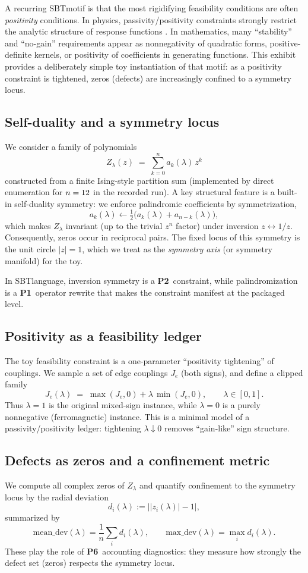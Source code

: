\documentclass[apajournal,article,submit,moreauthors,pdftex]{Definitions/mdpi}
\newcommand{\SBT}{\textsc{SBT}}
\newcommand{\Pone}{\textbf{P1}}
\newcommand{\Ptwo}{\textbf{P2}}
\newcommand{\Psix}{\textbf{P6}}
\begin{document}
A recurring \SBT motif is that the most rigidifying feasibility conditions are often \emph{positivity} conditions.
In physics, passivity/positivity constraints strongly restrict the analytic structure of response functions \cite{Willems1972II}.
In mathematics, many ``stability'' and ``no-gain'' requirements appear as nonnegativity of quadratic forms, positive-definite kernels, or positivity of coefficients in generating functions.
This exhibit provides a deliberately simple toy instantiation of that motif:
as a positivity constraint is tightened, zeros (defects) are increasingly confined to a symmetry locus.

\subsection{Self-duality and a symmetry locus}
We consider a family of polynomials
\[
Z_\lambda(z) \;=\; \sum_{k=0}^{n} a_k(\lambda)\,z^k
\]
constructed from a finite Ising-style partition sum (implemented by direct enumeration for $n=12$ in the recorded run).
A key structural feature is a built-in self-duality symmetry:
we enforce palindromic coefficients by symmetrization,
\[
a_k(\lambda)\leftarrow \tfrac12\bigl(a_k(\lambda)+a_{n-k}(\lambda)\bigr),
\]
which makes $Z_\lambda$ invariant (up to the trivial $z^n$ factor) under inversion $z\leftrightarrow 1/z$.
Consequently, zeros occur in reciprocal pairs.
The fixed locus of this symmetry is the unit circle $|z|=1$, which we treat as the \emph{symmetry axis} (or symmetry manifold) for the toy.

In \SBT language, inversion symmetry is a \Ptwo\ constraint, while palindromization is a \Pone\ operator rewrite that makes the constraint manifest at the packaged level.

\subsection{Positivity as a feasibility ledger}
The toy feasibility constraint is a one-parameter ``positivity tightening'' of couplings.
We sample a set of edge couplings $J_e$ (both signs), and define a clipped family
\[
J_e(\lambda) \;=\; \max(J_e,0) + \lambda\,\min(J_e,0),
\qquad \lambda\in[0,1].
\]
Thus $\lambda=1$ is the original mixed-sign instance, while $\lambda=0$ is a purely nonnegative (ferromagnetic) instance.
This is a minimal model of a passivity/positivity ledger: tightening $\lambda\downarrow 0$ removes ``gain-like'' sign structure.

\subsection{Defects as zeros and a confinement metric}
We compute all complex zeros of $Z_\lambda$ and quantify confinement to the symmetry locus by the radial deviation
\[
d_i(\lambda) := \bigl||z_i(\lambda)|-1\bigr|,
\]
summarized by
\[
\mathrm{mean\_dev}(\lambda)=\frac1n\sum_i d_i(\lambda),
\qquad
\mathrm{max\_dev}(\lambda)=\max_i d_i(\lambda).
\]
These play the role of \Psix\ accounting diagnostics: they measure how strongly the defect set (zeros) respects the symmetry locus.
\end{document}

